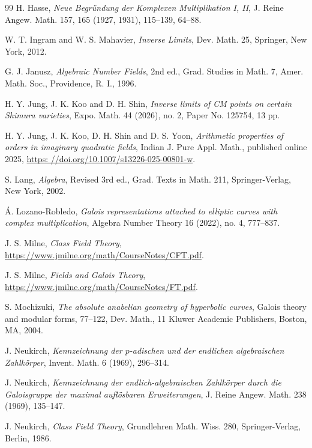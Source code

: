 \documentclass[reqno,11pt]{article}
\theoremstyle{plain} %
\theoremstyle{definition} %
\begin{document}
\begin{thebibliography}{99}
 H. Hasse, \textit{Neue Begr\"{u}ndung der Komplexen 
Multiplikation I, II}, J. Reine Angew. Math.
157, 165 (1927, 1931), 115--139, 64--88.

 W. T. Ingram and W. S. Mahavier, 
\textit{Inverse Limits}, Dev. Math. 25, Springer, New York, 2012.

 G. J. Janusz, \textit{Algebraic Number Fields}, 2nd ed., Grad. Studies in Math. 7, 
Amer. Math. Soc., Providence, R. I., 1996.

 H. Y. Jung, J. K. Koo and D. H. Shin,
\textit{Inverse limits of CM points on certain Shimura varieties},
Expo. Math. 44 (2026), no. 2, Paper No. 125754, 13 pp.

 H. Y. Jung, J. K. Koo, D. H. Shin and D. S. Yoon,
\textit{Arithmetic properties of orders in imaginary quadratic fields}, 
Indian J. Pure Appl. Math., published online 2025, \url{https:
//doi.org/10.1007/s13226-025-00801-w}.

 S. Lang, \textit{Algebra}, Revised 3rd ed.,
Grad. Texts in Math. 211,
Springer-Verlag, New York, 2002.

 \'{A}. Lozano-Robledo, \textit{Galois representations attached to elliptic curves with complex multiplication}, 
Algebra Number Theory 16 (2022), no. 4, 777--837.

 J. S. Milne, \textit{Class Field Theory}, 
\url{https://www.jmilne.org/math/CourseNotes/CFT.pdf}. 

 J. S. Milne, \textit{Fields and Galois Theory},
\url{https://www.jmilne.org/math/CourseNotes/FT.pdf}.

 S. Mochizuki, 
\textit{The absolute anabelian geometry of hyperbolic curves},
Galois theory and modular forms, 77--122, Dev. Math., 11
Kluwer Academic Publishers, Boston, MA, 2004. 

 J. Neukirch, 
\textit{Kennzeichnung der $p$-adischen und der endlichen algebraischen Zahlk\"{o}rper},
Invent. Math. 6 (1969), 296--314.

 J. Neukirch, 
\textit{Kennzeichnung der endlich-algebraischen Zahlk\"{o}rper durch die Galoisgruppe der maximal aufl\"{o}sbaren Erweiterungen}, J. Reine Angew. Math. 238 (1969), 135--147.

 J. Neukirch, \textit{Class Field Theory}, 
Grundlehren Math. Wiss. 280, Springer-Verlag, Berlin, 1986. 


\end{thebibliography}
\end{document}

